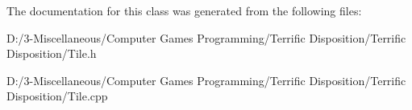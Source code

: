 The documentation for this class was generated from the following files\+:\begin{DoxyCompactItemize}
\item 
D\+:/3-\/\+Miscellaneous/\+Computer Games Programming/\+Terrific Disposition/\+Terrific Disposition/Tile.\+h\item 
D\+:/3-\/\+Miscellaneous/\+Computer Games Programming/\+Terrific Disposition/\+Terrific Disposition/Tile.\+cpp\end{DoxyCompactItemize}
